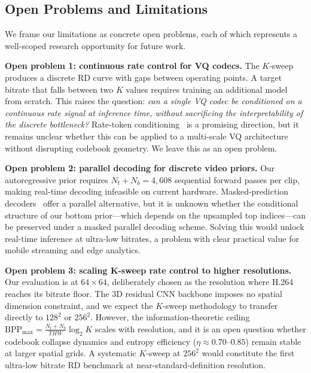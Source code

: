\documentclass[sigconf, screen, review, anonymous]{acmart}
\begin{document}
\subsection{Open Problems and Limitations}
\label{sec:limits}

We frame our limitations as concrete open problems, each of which
represents a well-scoped research opportunity for future work.

\noindent\textbf{Open problem 1: continuous rate control for VQ codecs.}
The $K$-sweep produces a discrete RD curve with gaps between operating
points. A target bitrate that falls between two $K$ values requires
training an additional model from scratch. This raises the question:
\emph{can a single VQ codec be conditioned on a continuous rate signal
at inference time, without sacrificing the interpretability of the
discrete bottleneck?} Rate-token conditioning~\cite{mentzer2024fsq}
is a promising direction, but it remains unclear whether this
can be applied to a multi-scale VQ architecture without disrupting
codebook geometry. We leave this as an open problem.

\noindent\textbf{Open problem 2: parallel decoding for discrete video priors.}
Our autoregressive prior requires $N_t + N_b = 4{,}608$ sequential
forward passes per clip, making real-time decoding infeasible on
current hardware. Masked-prediction decoders~\cite{yu2023magvit}
offer a parallel alternative, but it is unknown whether the
conditional structure of our bottom prior---which depends on the
upsampled top indices---can be preserved under a masked parallel
decoding scheme. Solving this would unlock real-time inference
at ultra-low bitrates, a problem with clear practical value for
mobile streaming and edge analytics.

\noindent\textbf{Open problem 3: scaling K-sweep rate control to higher
resolutions.}
Our evaluation is at $64\!\times\!64$, deliberately chosen as the
resolution where H.264 reaches its bitrate floor. The 3D residual CNN
backbone imposes no spatial dimension constraint, and we expect the
$K$-sweep methodology to transfer directly to $128^2$ or $256^2$.
However, the information-theoretic ceiling $\mathrm{BPP}_{\max} =
\frac{N_t+N_b}{THW}\log_2 K$ scales with resolution, and it is an open
question whether codebook collapse dynamics and entropy efficiency
($\eta \approx 0.70$--$0.85$) remain stable at larger spatial
grids. A systematic $K$-sweep at $256^2$ would constitute the first
ultra-low bitrate RD benchmark at near-standard-definition resolution.
\end{document}
